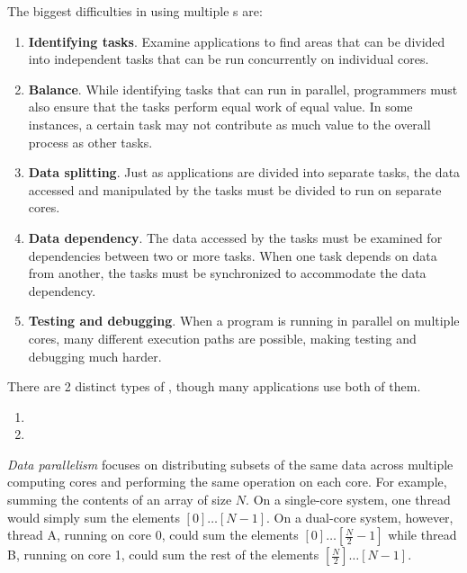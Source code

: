 The biggest difficulties in using multiple s are:
\begin{enumerate}[noitemsep]
\item \textbf{Identifying tasks}.
  Examine applications to find areas that can be divided into independent tasks that can be run concurrently on individual cores.
\item \textbf{Balance}.
  While identifying tasks that can run in parallel, programmers must also ensure that the tasks perform equal work of equal value.
  In some instances, a certain task may not contribute as much value to the overall process as other tasks.
\item \textbf{Data splitting}.
  Just as applications are divided into separate tasks, the data accessed and manipulated by the tasks must be divided to run on separate cores.
\item \textbf{Data dependency}.
  The data accessed by the tasks must be examined for dependencies between two or more tasks.
  When one task depends on data from another, the tasks must be synchronized to accommodate the data dependency.
\item \textbf{Testing and debugging}.
  When a program is running in parallel on multiple cores, many different execution paths are possible, making testing and debugging much harder.
\end{enumerate}

There are 2 distinct types of , though many applications use both of them.
\begin{enumerate}[noitemsep]
\item {}
\item {}
\end{enumerate}

\begin{definition}\label{def:Data_Parallelism}
  \emph{Data parallelism} focuses on distributing subsets of the same data across multiple computing cores and performing the same operation on each core.
  For example, summing the contents of an array of size $N$.
  On a single-core system, one thread would simply sum the elements $[0] \ldots [N-1]$.
  On a dual-core system, however, thread A, running on core 0, could sum the elements $[0] \ldots [\frac{N}{2}-1]$ while thread B, running on core 1, could sum the rest of the elements $[\frac{N}{2}] \ldots [N-1]$.
\end{definition}

